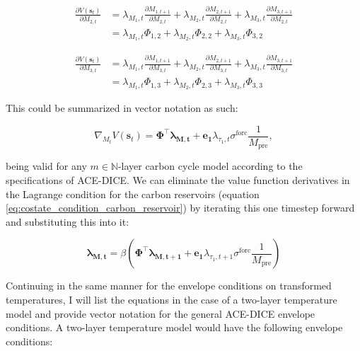\begin{equation*}
\begin{aligned}
    \frac{\partial V(\bm{s}_t)}{\partial M_{2,t}} &= 
        \lambda_{M_1,t}\frac{\partial M_{1,t+1}}{\partial M_{2,t}}
        + \lambda_{M_2,t}\frac{\partial M_{2,t+1}}{\partial M_{2,t}}
        + \lambda_{M_3,t}\frac{\partial M_{3,t+1}}{\partial M_{2,t}} \\
    &= \lambda_{M_1,t} \Phi_{1,2}
        + \lambda_{M_2,t} \Phi_{2,2}
        + \lambda_{M_3,t} \Phi_{3,2}
\end{aligned}
\end{equation*}

\begin{equation*}
\begin{aligned}
    \frac{\partial V(\bm{s}_t)}{\partial M_{3,t}} &= 
        \lambda_{M_1,t}\frac{\partial M_{1,t+1}}{\partial M_{3,t}}
        + \lambda_{M_2,t}\frac{\partial M_{2,t+1}}{\partial M_{3,t}}
        + \lambda_{M_3,t}\frac{\partial M_{3,t+1}}{\partial M_{3,t}} \\
    &= \lambda_{M_1,t} \Phi_{1,3}
        + \lambda_{M_2,t} \Phi_{2,3}
        + \lambda_{M_3,t} \Phi_{3,3}
\end{aligned}
\end{equation*}

This could be summarized in vector notation as such:

\begin{equation*}
    \nabla_{M_t}V(\bm{s}_t) = \bm{\Phi}^\top \bm{\lambda_{M,t}}
    + \bm{e_1} \lambda_{\tau_1,t} \sigma^{\text{forc}}\frac{1}{M_{\text{pre}}},
\end{equation*}

being valid for any \(m\in\mathbb{N}\)-layer carbon cycle model according to the specifications of ACE-DICE. We can eliminate the value function derivatives in the Lagrange condition for the carbon reservoirs (equation \ref{eq:costate_condition_carbon_reservoir}) by iterating this one timestep forward and substituting this into it:

\begin{equation}
    \bm{\lambda_{M,t}} = \beta \left( 
        \bm{\Phi}^\top \bm{\lambda_{M,t+1}}
        + \bm{e_1} \lambda_{\tau_1,t+1} \sigma^{\text{forc}}\frac{1}{M_{\text{pre}}} 
    \right)
\label{eq:lagrange_condition_carbon_reservoir_final}
\end{equation}

Continuing in the same manner for the envelope conditions on transformed temperatures, I will list the equations in the case of a two-layer temperature model and provide vector notation for the general ACE-DICE envelope conditions. A two-layer temperature model would have the following envelope conditions:

